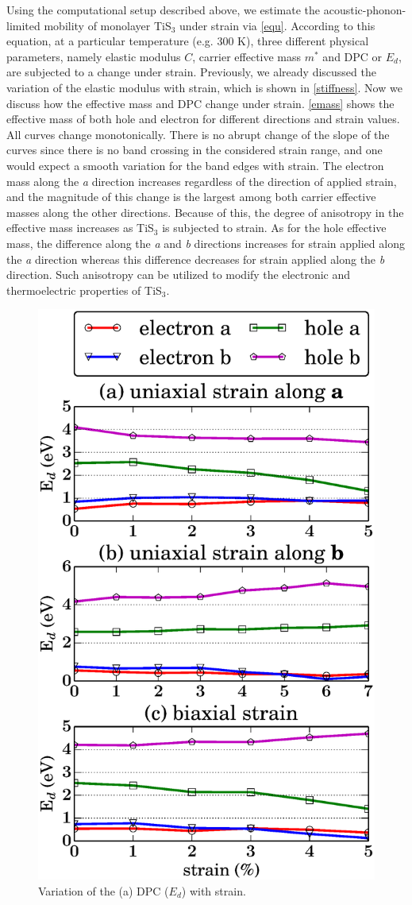 Using the computational setup described above, we estimate the acoustic-phonon-limited mobility of monolayer TiS$_3$ under  strain via \autoref{equ}. According to this equation, at a particular temperature (e.g. 300 K),  three different physical parameters, namely elastic modulus $C$, carrier effective mass $m^*$ and DPC or $E_d$,  are subjected to a change under strain. Previously, we already discussed the variation of the elastic modulus with strain, which is shown in \autoref{stiffness}. Now we discuss how the effective mass and DPC change under strain. \autoref{emass} shows the effective mass of both hole and electron for different directions and strain values. All curves change monotonically. There is no abrupt change of the slope of the curves since there is no band crossing in the considered strain range, and one would expect a smooth variation for the band edges with strain. The electron mass along the \textit{a} direction increases regardless of the direction of applied strain, and the magnitude of this change is the largest among both carrier effective masses along the other directions. Because of this, the degree of anisotropy in the effective mass increases as TiS$_3$ is subjected to strain. As for the hole effective mass, the difference along the \textit{a} and \textit{b} directions increases for strain applied along the \textit{a} direction whereas this difference decreases for strain applied along the \textit{b} direction. Such anisotropy can be utilized to modify the electronic and thermoelectric properties of TiS$_3$.  

\begin{figure}[htb]
\centering
\includegraphics[width=0.6\linewidth]{Mob_dePotential.eps}
\caption{Variation of the (a) DPC ($E_d$) with strain. \label{dePotential}}
\end{figure}

